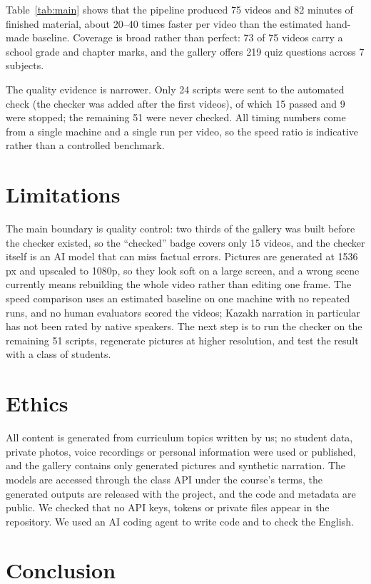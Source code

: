 \documentclass[10pt]{article}
\begin{document}
Table~\ref{tab:main} shows that the pipeline produced 75 videos and 82 minutes of finished material, about 20--40 times faster per video than the estimated hand-made baseline. Coverage is broad rather than perfect: 73 of 75 videos carry a school grade and chapter marks, and the gallery offers 219 quiz questions across 7 subjects.

The quality evidence is narrower. Only 24 scripts were sent to the automated check (the checker was added after the first videos), of which 15 passed and 9 were stopped; the remaining 51 were never checked. All timing numbers come from a single machine and a single run per video, so the speed ratio is indicative rather than a controlled benchmark.

\section{Limitations}

The main boundary is quality control: two thirds of the gallery was built before the checker existed, so the ``checked'' badge covers only 15 videos, and the checker itself is an AI model that can miss factual errors. Pictures are generated at 1536 px and upscaled to 1080p, so they look soft on a large screen, and a wrong scene currently means rebuilding the whole video rather than editing one frame. The speed comparison uses an estimated baseline on one machine with no repeated runs, and no human evaluators scored the videos; Kazakh narration in particular has not been rated by native speakers. The next step is to run the checker on the remaining 51 scripts, regenerate pictures at higher resolution, and test the result with a class of students.

\section{Ethics}

All content is generated from curriculum topics written by us; no student data, private photos, voice recordings or personal information were used or published, and the gallery contains only generated pictures and synthetic narration. The models are accessed through the class API under the course's terms, the generated outputs are released with the project, and the code and metadata are public. We checked that no API keys, tokens or private files appear in the repository. We used an AI coding agent to write code and to check the English.

\section{Conclusion}
\end{document}
